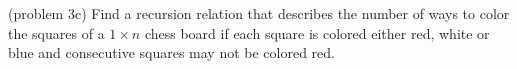 \documentclass[handout]{ximera}
\begin{document}
\begin{problem}(problem 3c) 
Find a recursion relation that describes the number of ways to color the squares of a $1 \times n$ chess board if each square is colored either red, white or blue and consecutive squares may not be colored red.\\

\begin{multipleChoice}
\\
\\
\\
\end{multipleChoice}

\end{problem}
\end{document}
